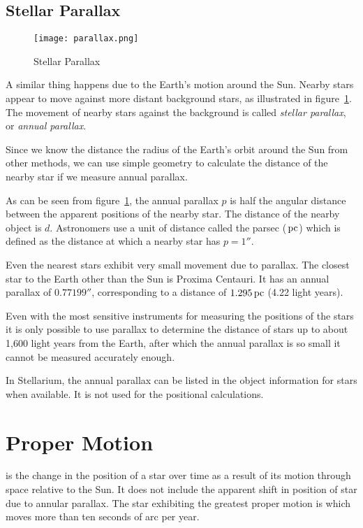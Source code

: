 \subsection{Stellar Parallax}
\label{sec:Concepts:StellarParallax}

\begin{figure}[tb]
\centering\texttt{[image: parallax.png]}
\caption{Stellar Parallax}
\label{fig:Parallax}
\end{figure}

A similar thing happens due to the Earth's motion around the Sun. Nearby
stars appear to move against more distant background stars, as
illustrated in figure~\ref{fig:Parallax}.
The movement of nearby stars against the background is called
\emph{stellar parallax}, or \emph{annual parallax}.

Since we know the distance the radius of the Earth's orbit around the
Sun from other methods, we can use simple geometry to calculate the
distance of the nearby star if we measure annual parallax.

As can be seen from figure~\ref{fig:Parallax}, the annual
parallax $p$ is half the angular distance between the apparent positions
of the nearby star. The distance of the nearby object is $d$. Astronomers
use a unit of distance called the parsec ($\pc$) which is defined as the
distance at which a nearby star has $p=1''$.

Even the nearest stars exhibit very small movement due to
parallax. The closest star to the Earth other than the Sun is Proxima
Centauri. It has an annual parallax of $0.77199''$, corresponding to a
distance of $1.295\pc$ (4.22 light years).

Even with the most sensitive instruments for measuring the positions of
the stars it is only possible to use parallax to determine the distance
of stars up to about 1,600 light years from the Earth, after which the
annual parallax is so small it cannot be measured accurately enough.

In Stellarium, the annual parallax can be listed in the object information for stars
when available. It is not used for the positional calculations.

\section{Proper Motion}
\label{sec:Concepts:ProperMotion}

 is the change in the position of a star over time as a
result of its motion through space relative to the Sun. It does not
include the apparent shift in position of star due to annular parallax.
The star exhibiting the greatest proper motion is  which
moves more than ten seconds of arc per year.

